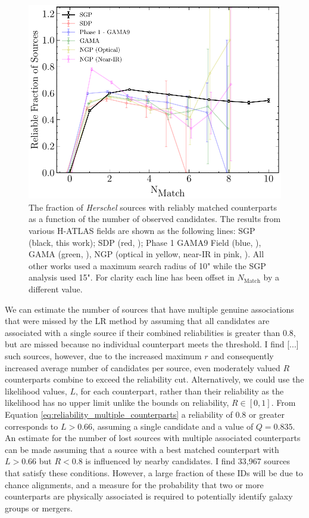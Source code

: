 \begin{figure}
    \centering
    \includegraphics[width=\columnwidth]{Figures/multiplicity.pdf}
    \caption{The fraction of \textit{Herschel} sources with reliably matched counterparts as a function of the number of observed candidates. The results from various H-ATLAS fields are shown as the following lines: SGP (black, this work); SDP (red, \citealt{Smith_2011}); Phase 1 GAMA9 Field (blue, \citealt{Fleuren_2012}), GAMA (green, \citealt{Bourne_2016}), NGP (optical in yellow, near-IR in pink, \citealt{Furlanetto_2018}). All other works used a maximum search radius of 10" while the SGP analysis used 15". For clarity each line has been offset in $N_{\textrm{Match}}$ by a different value.}
    \label{fig:multiplicity}
\end{figure}

We can estimate the number of sources that have multiple genuine associations that were missed by the LR method by assuming that all candidates are associated with a single source if their combined reliabilities is greater than 0.8, but are missed because no individual counterpart meets the threshold. I find [...] such sources, however, due to the increased maximum $r$ and consequently increased average number of candidates per source, even moderately valued $R$ counterparts combine to exceed the reliability cut. Alternatively, we could use the likelihood values, $L$, for each counterpart, rather than their reliability as the likelihood has no upper limit unlike the bounds on reliability, $R \in [0, 1]$. From Equation \ref{eq:reliability_multiple_counterparts} a reliability of 0.8 or greater corresponds to $L > 0.66$, assuming a single candidate and a value of $Q = 0.835$. An estimate for the number of lost sources with multiple associated counterparts can be made assuming that a source with a best matched counterpart with $L > 0.66$ but $R < 0.8$ is influenced by nearby candidates. I find 33,967 sources that satisfy these conditions. However, a large fraction of these IDs will be due to chance alignments, and a measure for the probability that two or more counterparts are physically associated is required to potentially identify galaxy groups or mergers. 

